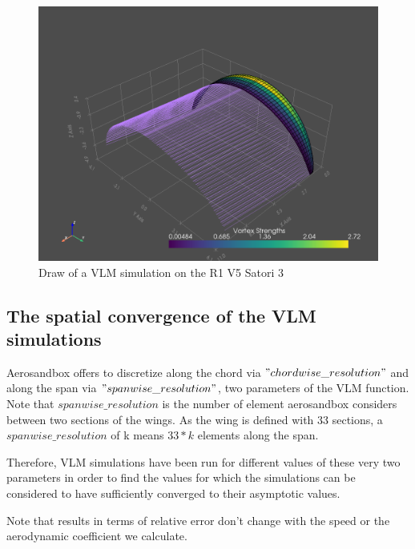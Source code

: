 \begin{figure}[H]
    \centering
    \includegraphics[width=1.\linewidth]{figures/Optimization/3D/vlm.png}
    \caption{Draw of a VLM simulation on the R1 V5 Satori 3}
    \label{fig:Draw of a VLM simulation on the R1 V5 Satori 3}
\end{figure}

\subsection{The spatial convergence of the VLM simulations}
\label{sub:Ch2.3.1}

Aerosandbox offers to discretize along the chord via $"chordwise\_resolution"$ and along the span via $"spanwise\_resolution"$, two parameters of the VLM function. Note that $spanwise\_resolution$ is the number of element aerosandbox considers between two sections of the wings. As the wing is defined with 33 sections, a $spanwise\_resolution$ of k means $33 * k$ elements along the span.

Therefore, VLM simulations have been run for different values of these very two parameters in order to find the values for which the simulations can be considered to have sufficiently converged to their asymptotic values.

Note that results in terms of relative error don't change with the speed or the aerodynamic coefficient we calculate.

